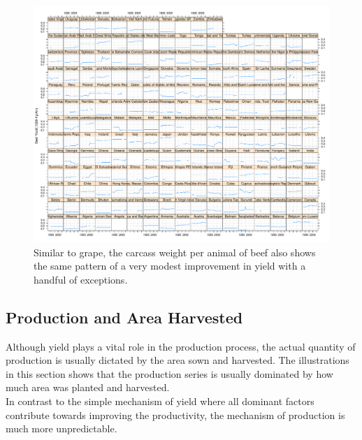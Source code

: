 \documentclass[nojss]{jss}\usepackage[]{graphicx}\usepackage[]{color}
\makeatletter
\def\maxwidth{ %
  \ifdim\Gin@nat@width>\linewidth
    \linewidth
  \else
    \Gin@nat@width
  \fi
}
\newenvironment{knitrout}{}{} %
\makeatother
\begin{document}
\begin{knitrout}
\color{fgcolor}\begin{figure}[!ht]


{\centering \includegraphics[width=\maxwidth]{figure/beef-yield-explore} 

}

\caption[Similar to grape, the carcass weight per animal of beef also shows the same pattern of a very modest improvement in yield with a handful of exceptions]{Similar to grape, the carcass weight per animal of beef also shows the same pattern of a very modest improvement in yield with a handful of exceptions.\label{fig:beef-yield-explore}}
\end{figure}


\end{knitrout}




\FloatBarrier
\subsection{Production and Area Harvested}

Although yield plays a vital role in the production process, the
actual quantity of production is usually dictated by the area sown and
harvested. The illustrations in this section shows that the production
series is usually dominated by how much area was planted and
harvested.\\

In contrast to the simple mechanism of yield where all dominant
factors contribute towards improving the productivity, the mechanism
of production is much more unpredictable. \\
\end{document}

